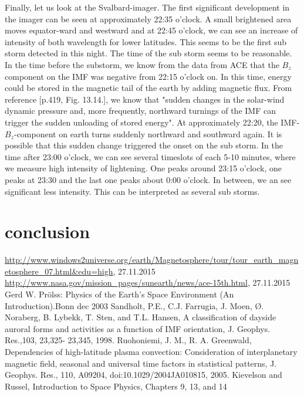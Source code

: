 \documentclass[10pt,a4paper]{article}
\begin{document}
Finally, let us look at the Svalbard-imager. The first significant development in the imager can be seen at approximately 22:35 o'clock. A small brightened area moves equator-ward and westward and at 22:45 o'clock, we can see an increase of intensity of both wavelength for lower latitudes. This seems to be the first sub storm detected in this night. The time of the sub storm seems to be reasonable. In the time before the substorm, we know from the data from ACE that the $B_z$ component on the IMF was negative from 22:15 o'clock on. In this time, energy could be stored in the magnetic tail of the earth by adding magnetic flux. From reference \cite{Buch2}[p.419, Fig. 13.14.], we know that "sudden changes in the solar-wind dynamic pressure and, more frequently, northward turnings of the IMF can trigger the sudden unloading of stored energy". At approximately 22:20, the IMF-$B_z$-component on earth turns suddenly northward and southward again. It is possible that this sudden change triggered the onset on the sub storm. 
In the time after 23:00 o'clock, we can see several timeslots of each 5-10 minutes, where we measure high intensity of lightening. One peaks around 23:15 o'clock, one peaks at 23:30 and the last one peaks about 0:00 o'clock. In between, we an see significant less intensity. This can be interpreted as several sub storms. 

\section{conclusion}




\newpage




\begin{thebibliography}{mustermarke}
 \url{http://www.windows2universe.org/earth/Magnetosphere/tour/tour_earth_magnetosphere_07.html&edu=high}, 27.11.2015
 \url{http://www.nasa.gov/mission_pages/sunearth/news/ace-15th.html}, 27.11.2015
 Gerd W. Prölss: Physics of the Earth's Space Environment (An Introduction).Bonn  dec 2003 
 Sandholt, P.E., C.J. Farrugia, J. Moen, Ø. Noraberg, B. Lybekk, T. Sten, and T.L. Hansen, A classification
of dayside auroral forms and activities as a function of IMF orientation, J. Geophys. Res.,103, 23,325-
23,345, 1998.
 Ruohoniemi, J. M., R. A. Greenwald, Dependencies of high-latitude plasma convection: Consideration
of interplanetary magnetic field, seasonal and universal time factors in statistical patterns, J. Geophys.
Res., 110, A09204, doi:10.1029/2004JA010815, 2005.
 Kievelson and Russel, Introduction to Space Physics, Chapters 9, 13, and 14
\end{thebibliography}
\end{document}
